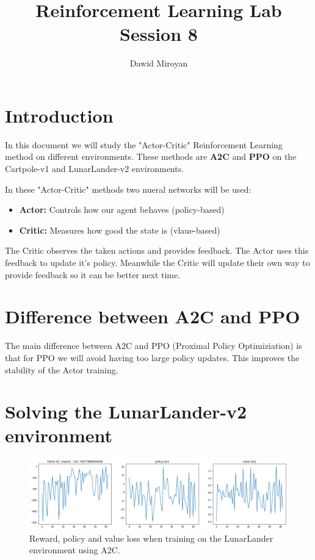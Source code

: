 \documentclass[a4paper]{article}
\title{Reinforcement Learning Lab Session 8}
\author{Dawid Miroyan}
\begin{document}
\maketitle
\section*{Introduction}
In this document we will study the "Actor-Critic" Reinforcement Learning method on different environments. These methods are \textbf{A2C} and \textbf{PPO} on the Cartpole-v1 and LunarLander-v2 environments.

In these "Actor-Critic" methods two nueral networks will be used:
\begin{itemize}
\item \textbf{Actor:} Controls how our agent behaves (policy-based)
\item \textbf{Critic:} Measures how good the state is (vlaue-based)
\end{itemize}

The Critic observes the taken actions and provides feedback. The Actor uses this feedback to update it's policy.
Meanwhile the Critic will update their own way to provide feedback so it can be better next time.

\tableofcontents
\newpage

\section{Difference between A2C and PPO}
The main difference between A2C and PPO (Proximal Policy Optimiziation) is that for PPO we will avoid having too large policy updates. This improves the stability of the Actor training.


\section{Solving the LunarLander-v2 environment}

\begin{figure}[H]
    \centering
    \includegraphics[width=\linewidth]{plots/LL_A2C.png}
    \caption{Reward, policy and value loss when training on the LunarLander environment using A2C.}
    \label{fig:LL_A2C}
\end{figure}
\end{document}
